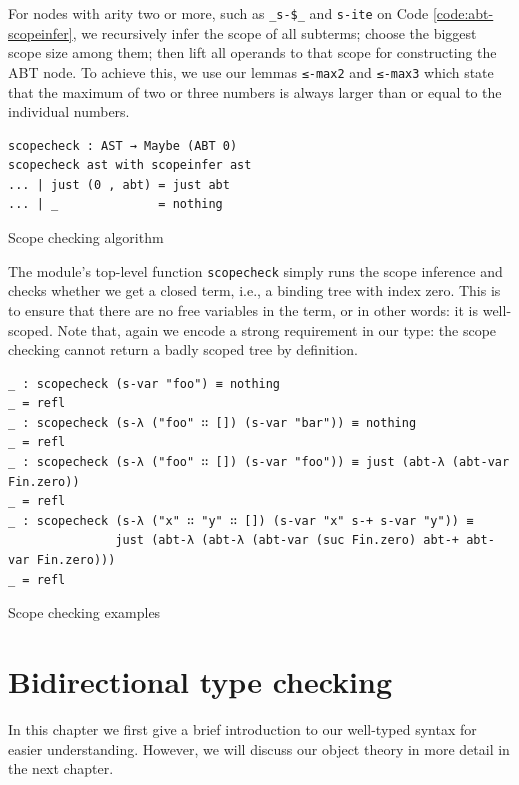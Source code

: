 For nodes with arity two or more, such as \verb$_s-$\verb=$=\verb$_$ and \verb$s-ite$ on Code \ref{code:abt-scopeinfer}, we recursively infer the scope of all subterms; choose the biggest scope size among them; then lift all operands to that scope for constructing the ABT node. To achieve this, we use our lemmas \verb$≤-max2$ and \verb$≤-max3$ which state that the maximum of two or three numbers is always larger than or equal to the individual numbers.

\begin{listing}[H]
\begin{verbatim}
scopecheck : AST → Maybe (ABT 0)
scopecheck ast with scopeinfer ast
... | just (0 , abt) = just abt
... | _              = nothing
\end{verbatim}
\caption{Scope checking algorithm}
\label{code:abt-scopecheck}
\end{listing}

The module's top-level function \verb$scopecheck$ simply runs the scope inference and checks whether we get a closed term, i.e., a binding tree with index zero. This is to ensure that there are no free variables in the term, or in other words: it is well-scoped. Note that, again we encode a strong requirement in our type: the scope checking cannot return a badly scoped tree by definition.

\begin{listing}[H]
\begin{verbatim}
_ : scopecheck (s-var "foo") ≡ nothing
_ = refl
_ : scopecheck (s-λ ("foo" ∷ []) (s-var "bar")) ≡ nothing
_ = refl
_ : scopecheck (s-λ ("foo" ∷ []) (s-var "foo")) ≡ just (abt-λ (abt-var Fin.zero))
_ = refl
_ : scopecheck (s-λ ("x" ∷ "y" ∷ []) (s-var "x" s-+ s-var "y")) ≡
               just (abt-λ (abt-λ (abt-var (suc Fin.zero) abt-+ abt-var Fin.zero)))
_ = refl
\end{verbatim}
\caption{Scope checking examples}
\label{code:abt-scopecheck-ex}
\end{listing}

\newpage

\section{Bidirectional type checking} \label{sec:typecheck}

In this chapter we first give a brief introduction to our well-typed syntax for easier understanding. However, we will discuss our object theory in more detail in the next chapter.

